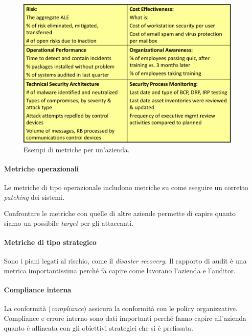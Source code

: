 \begin{figure}[h!]
        \begin{center}
                \includegraphics[scale=1.5]{res/img/metriche}
        \end{center}
        \caption{Esempi di metriche per un'azienda.}
\end{figure}

\paragraph*{Metriche operazionali}

Le metriche di tipo operazionale includono metriche su come eseguire
un corretto \textit{patching} dei sistemi.

Confrontare le metriche con quelle di altre aziende permette di capire quanto
siamo un possibile \textit{target} per gli attaccanti.

\paragraph*{Metriche di tipo strategico}

Sono i piani legati al rischio, come il \textit{disaster recovery}.
Il rapporto di audit è una metrica importantissima perché fa capire come
lavorano l'azienda e l'auditor.

\paragraph*{Compliance interna}

La conformità (\textit{compliance}) assicura la conformità con le policy
organizzative. Compliance e errore interno sono dati importanti perché
fanno capire all'azienda quanto è allineata con gli obiettivi strategici che
si è prefissata.


